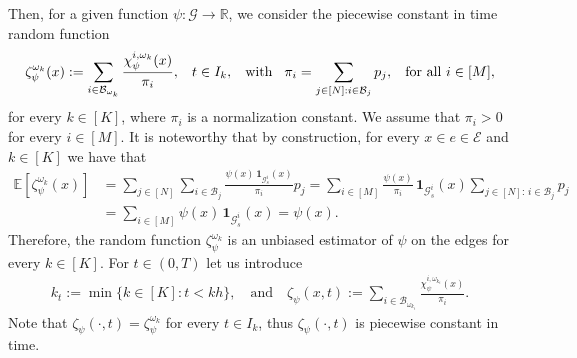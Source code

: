 \documentclass[a4paper, 10pt, english]{article}
\def\R{\mathbb R}
\def\to{\rightarrow}
\begin{document}
Then, for a given function $\psi : \mathcal{G} \to \R$, we consider the piecewise constant in time random function  
\begin{align}\label{eq:coef_random}
    \zeta^{\omega_k}_\psi(x): = \sum_{i \in \mathcal{B}_{\omega_k}} \frac{\chi^{i,\omega_k}_\psi(x)}{\pi_i}, \hspace{0.3cm} t \in I_k, \hspace{0.3cm}\text{with} \hspace{0.3cm}  \pi_{i} = \sum_{j \in [N] : i \in \mathcal{B}_j} p_j,  \hspace{0.3cm} \text{for all } i \in [M],
\end{align} 
for every $k \in [K]$, where $\pi_i$ is a normalization constant. We assume that $\pi_i>0$ for every $i\in[M]$. It is noteworthy that by construction, for every $x\in e\in \mathcal{E}$ and $k \in [K]$ we have that  
\begin{align}\label{eq:general_unbias}
\mathbb{E}[\zeta_\psi^{\omega_k}(x)]
&=\sum_{j\in [N]} \sum_{i\in\mathcal B_j}\frac{\psi(x)\,\mathbf1_{\mathcal G_s^i}(x)}{\pi_i} p_j
=\sum_{i\in [M]} \frac{\psi(x)}{\pi_i}\,\mathbf1_{\mathcal G_s^i}(x)\sum_{j\in [N]:\,i\in\mathcal B_j}p_j\\
&\nonumber=\sum_{i\in [M]} \psi(x)\,\mathbf1_{\mathcal G_s^i}(x)
=\psi(x).
\end{align}
Therefore, the random function $\zeta_\psi^{\omega_k}$ is an unbiased estimator of $\psi$ on the edges for every $k \in [K]$. For $t\in(0,T)$ let us introduce
\begin{align}\label{eq:coef_random2}
  k_t := \min\{k\in[K] : t < k h\},
  \quad\text{and}\quad 
  \zeta_\psi(x,t) := \sum_{i\in\mathcal B_{\omega_{k_t}}}\frac{\chi_\psi^{i,\omega_{k_t}}(x)}{\pi_i}.
\end{align}
Note that  $\zeta_\psi(\cdot,t) = \zeta_\psi^{\omega_k}$ for every $t\in I_k$, thus $\zeta_\psi(\cdot,t)$ is piecewise constant in time.
\smallbreak
\end{document}
